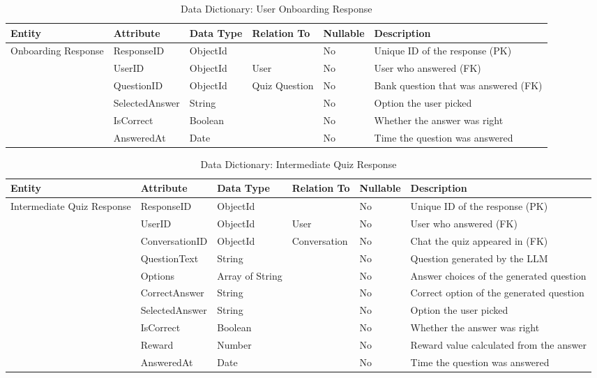 \documentclass{FastFyp}
\begin{document}
\begin{table}[H]
\centering
\small
\setlength{\tabcolsep}{4pt}
\caption{Data Dictionary: User Onboarding Response}
\begin{tabular}{|p{2.0cm}|p{2.5cm}|p{1.7cm}|p{1.9cm}|p{1.3cm}|p{4.6cm}|}
\hline
\textbf{Entity} & \textbf{Attribute} & \textbf{Data Type} & \textbf{Relation To} & \textbf{Nullable} & \textbf{Description} \\ \hline
Onboarding Response & ResponseID & ObjectId & & No & Unique ID of the response (PK) \\ \cline{2-6}
 & UserID & ObjectId & User & No & User who answered (FK) \\ \cline{2-6}
 & QuestionID & ObjectId & Quiz Question & No & Bank question that was answered (FK) \\ \cline{2-6}
 & SelectedAnswer & String & & No & Option the user picked \\ \cline{2-6}
 & IsCorrect & Boolean & & No & Whether the answer was right \\ \cline{2-6}
 & AnsweredAt & Date & & No & Time the question was answered \\ \hline
\end{tabular}
\end{table}

\begin{table}[H]
\centering
\small
\setlength{\tabcolsep}{4pt}
\caption{Data Dictionary: Intermediate Quiz Response}\label{tab:dd_quiz}
\begin{tabular}{|p{2.0cm}|p{2.5cm}|p{1.7cm}|p{1.9cm}|p{1.3cm}|p{4.6cm}|}
\hline
\textbf{Entity} & \textbf{Attribute} & \textbf{Data Type} & \textbf{Relation To} & \textbf{Nullable} & \textbf{Description} \\ \hline
Intermediate Quiz Response & ResponseID& ObjectId & & No & Unique ID of the response (PK) \\ \cline{2-6}
 & UserID & ObjectId & User & No & User who answered (FK) \\ \cline{2-6}
 & ConversationID & ObjectId & Conversation & No & Chat the quiz appeared in (FK) \\ \cline{2-6}
 & QuestionText & String & & No & Question generated by the LLM \\ \cline{2-6}
 & Options & Array of String & & No & Answer choices of the generated question \\ \cline{2-6}
 & CorrectAnswer & String & & No & Correct option of the generated question \\ \cline{2-6}
 & SelectedAnswer & String & & No & Option the user picked \\ \cline{2-6}
 & IsCorrect & Boolean & & No & Whether the answer was right \\ \cline{2-6}
 & Reward & Number & & No & Reward value calculated from the answer \\ \cline{2-6}
 & AnsweredAt & Date & & No & Time the question was answered \\ \hline
\end{tabular}
\end{table}
\endgroup
\end{document}
